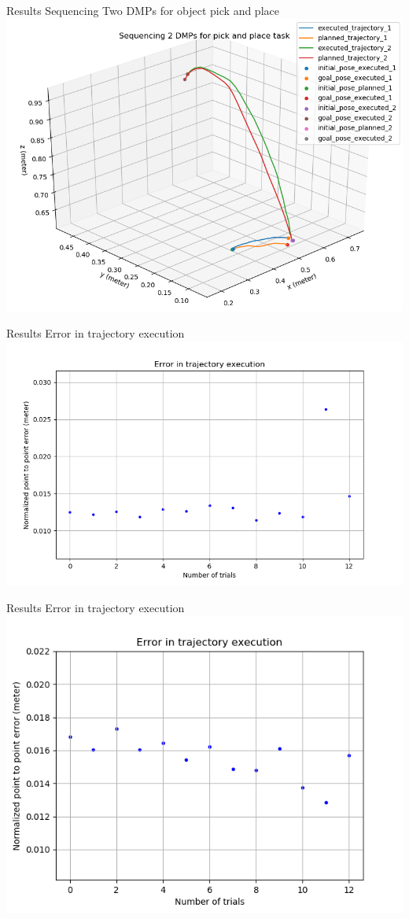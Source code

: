 \documentclass{beamer}
\begin{document}
	
	\begin{frame}{Results}
		\centering
		Sequencing Two DMPs for object pick and place
		\includegraphics[scale=0.4]{images/HSR_3/sequence.png}
	\end{frame}
	\begin{frame}{Results}
		\centering
		Error in trajectory execution
		\includegraphics[scale=0.4]{images/HSR_3/sequence_0_e.png}
	\end{frame}

	\begin{frame}{Results}
		\centering
		Error in trajectory execution
		\includegraphics[scale=0.4]{images/HSR_3/sequence_1_e.png}
	\end{frame}
\end{document}

